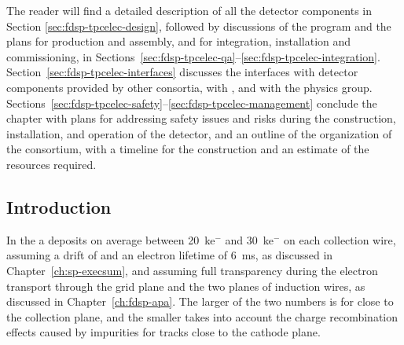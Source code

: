 The reader will find a detailed
description of all the  detector components in Section
\ref{sec:fdsp-tpcelec-design}, followed by discussions of the 
program and %
the plans for production and assembly, and for integration,
installation and commissioning, in 
Sections~\ref{sec:fdsp-tpcelec-qa}--\ref{sec:fdsp-tpcelec-integration}. 
Section~\ref{sec:fdsp-tpcelec-interfaces} discusses the interfaces with detector components provided by other consortia, with , and with the physics group. 
Sections~\ref{sec:fdsp-tpcelec-safety}--\ref{sec:fdsp-tpcelec-management} conclude the chapter with  plans for addressing safety issues and risks during the
construction, installation, and operation of the detector, and %
an outline of the organization of the  consortium, 
with a timeline for the  construction and an estimate
of the resources required.

\subsection{Introduction}
\label{sec:fdsp-tpcelec-overview-intro}


In the   a  deposits on average between
\SI{20}{k}{e$^-$} and \SI{30}{k}{e$^-$} on each collection wire, assuming a drift \efield
of %
\spmaxfield and an electron lifetime of \SI{6}{ms}, as discussed in
Chapter~\ref{ch:sp-execsum}, and assuming full transparency during the 
electron transport through the grid plane and the two planes of induction
wires, as discussed in Chapter~\ref{ch:fdsp-apa}. The larger of the two numbers 
is for  close to the collection plane, and the smaller %
takes into account the charge recombination effects caused by impurities for 
tracks close to the cathode plane. 

